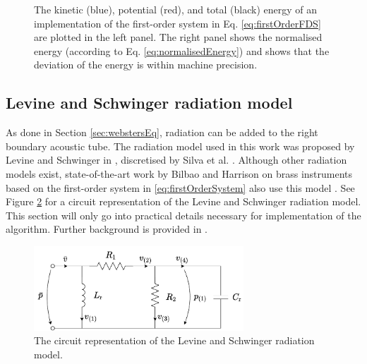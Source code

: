 {\begin{figure}[h]
      \caption{The kinetic (blue), potential (red), and total (black) energy of an implementation of the first-order system in Eq. \eqref{eq:firstOrderFDS} are plotted in the left panel. The right panel shows the normalised energy (according to Eq. \eqref{eq:normalisedEnergy}) and shows that the deviation of the energy is within machine precision. \label{fig:energyFirstOrder}}
\end{figure}

\subsection{Levine and Schwinger radiation model}\label{sec:levineSchwing}
\def\r{\text{r}}
\def\one{{(1)}}
As done in Section \ref{sec:webstersEq}, radiation can be added to the right boundary acoustic tube. The radiation model used in this work was proposed by Levine and Schwinger in \cite{Levine1948}, discretised by Silva et al. \cite{Silva2009}. Although other radiation models exist, state-of-the-art work by Bilbao and Harrison on brass instruments based on the first-order system in \eqref{eq:firstOrderSystem} also use this model \cite{Bilbao2013, Harrison2018}. See Figure \ref{fig:circuit} for a circuit representation of the Levine and Schwinger radiation model. This section will only go into practical details necessary for implementation of the algorithm. Further background is provided in \cite{Harrison2018}.

\begin{figure}[t]
    \centering
    \includegraphics[width=0.7\textwidth]{figures/resonators/brass/circuit.pdf}
    \caption{The circuit representation of the Levine and Schwinger radiation model. \label{fig:circuit}}
\end{figure}

}
